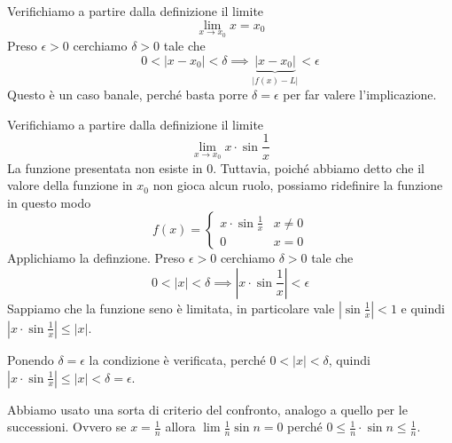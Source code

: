 \begin{example}
Verifichiamo a partire dalla definizione il limite
\begin{equation*}
\lim_{x \to x_0} x = x_0
\end{equation*}
Preso $\epsilon > 0$ cerchiamo $\delta > 0$ tale che
\begin{equation*}
0 < |x - x_0| < \delta \implies \underbrace{|x-x_0|}_{|f(x)-L|} < \epsilon
\end{equation*}
Questo è un caso banale, perché basta porre $\delta = \epsilon$ per far valere l'implicazione.
\end{example}

\begin{example}
Verifichiamo a partire dalla definizione il limite
\begin{equation*}
\lim_{x \to x_0} x \cdot \sin \frac{1}{x}
\end{equation*}
La funzione presentata non esiste in 0. Tuttavia, poiché abbiamo detto che il valore della funzione in $x_0$ non gioca alcun ruolo, possiamo ridefinire la funzione in questo modo
\begin{equation*}
f(x) = \begin{cases}
x \cdot \sin \frac{1}{x} & x \neq 0 \\
0 & x = 0
\end{cases}
\end{equation*}
Applichiamo la definzione. Preso $\epsilon > 0$ cerchiamo $\delta > 0$ tale che
\begin{equation*}
0 < |x| < \delta \implies \left\lvert x \cdot \sin \frac{1}{x} \right\rvert < \epsilon
\end{equation*}
Sappiamo che la funzione seno è limitata, in particolare vale $|\sin \frac{1}{x}| < 1$ e quindi $|x \cdot \sin \frac{1}{x}| \le |x|$.

Ponendo $\delta = \epsilon$ la condizione è verificata, perché $0 < |x| < \delta$, quindi $|x \cdot \sin \frac{1}{x}| \le |x| < \delta = \epsilon$.

Abbiamo usato una sorta di criterio del confronto, analogo a quello per le successioni. Ovvero se $x = \frac{1}{n}$ allora $\lim \frac{1}{n} \sin n = 0$ perché $0 \le \frac{1}{n} \cdot \sin n \le \frac{1}{n}$.
\end{example}

